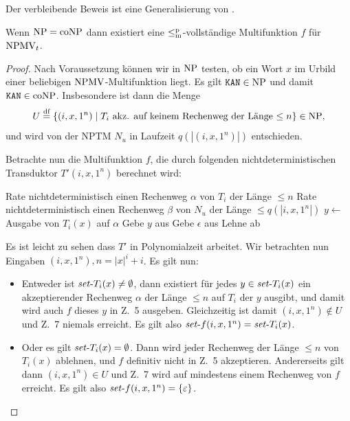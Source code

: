 Der verbleibende Beweis ist eine Generalisierung von \textcite{dingel_separation_2022}.
\begin{theorem}\label{thm:npmvt-vs-npconp}
    Wenn $\mathrm{NP}=\mathrm{coNP}$ dann existiert eine $\leq_\mathrm{m}^\mathrm{p}$-vollständige Multifunktion $f$ für $\mathrm{NPMV}_t$.
\end{theorem}
\begin{proof}
    Nach Voraussetzung können wir in $\mathrm{NP}$ testen, ob ein Wort $x$ im Urbild einer beliebigen $\mathrm{NPMV}$-Multifunktion liegt.
    Es gilt $\mathtt{KAN}\in\mathrm{NP}$ und damit $\mathtt{KAN}\in\mathrm{coNP}$. Insbesondere ist dann die Menge
    \[ U \stackrel{\text{df}}{=}  \{ (i, x, 1^n) \mid T_i \text{ akz. auf keinem Rechenweg der Länge $\leq n$} \} \in\mathrm{NP},  \]
    und wird von der NPTM $N_u$ in Laufzeit $q(|(i, x, 1^n)|)$ entschieden.

    Betrachte nun die Multifunktion $f$, die durch folgenden nichtdeterministischen Transduktor $T'(i, x, 1^n)$ berechnet wird:\\
    \begin{algorithm}[H]
        Rate nichtdeterministisch einen Rechenweg $\alpha$ von $T_i$ der Länge $\leq n$\;
        Rate nichtdeterministisch einen Rechenweg $\beta$ von $N_u$ der Länge $\leq q(|i, x, 1^n|)$\;
        {
            $y\gets $ Ausgabe von $T_i(x)$ auf $\alpha$\;
            Gebe $y$ aus\;
        }
        {
            Gebe $\epsilon$ aus\;
        }
        \Else
        {
            Lehne ab\;
        }
    \end{algorithm}
    Es ist leicht zu sehen dass $T'$ in Polynomialzeit arbeitet. Wir betrachten nun Eingaben $(i, x, 1^n), n={|x|^i+i}$. Es gilt nun:
    \begin{itemize}[nosep]
        \item Entweder ist $\mathit{set}\text{-}{T_i}(x)\neq \emptyset$, dann existiert für jedes $y\in \mathit{set}\text{-}{T_i}(x)$ ein akzeptierender Rechenweg $\alpha$ der Länge $\leq n$ auf $T_i$ der $y$ ausgibt, und damit wird auch $f$ dieses $y$ in Z.~5 ausgeben.
            Gleichzeitig ist damit $(i, x, 1^n)\not\in U$ und Z.~7 niemals erreicht.
            Es gilt also $\mathit{set}\text{-}{f}(i, x, 1^n)=\mathit{set}\text{-}{T_i}(x)$.
        \item Oder es gilt $\mathit{set}\text{-}{T_i}(x)=\emptyset$.
            Dann wird jeder Rechenweg der Länge $\leq n$ von $T_i(x)$ ablehnen, und $f$ definitiv nicht in Z.~5 akzeptieren.
            Andererseits gilt dann $(i, x, 1^n)\in U$ und Z.~7 wird auf mindestens einem Rechenweg von $f$ erreicht.
            Es gilt also $\mathit{set}\text{-}{f}(i, x, 1^n)=\{\varepsilon\}$.
    \end{itemize}


\end{proof}

